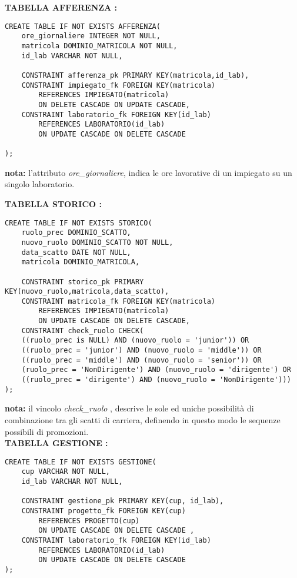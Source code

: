 \noindent\textbf{TABELLA AFFERENZA :}
\scriptsize
\begin{lstlisting}
CREATE TABLE IF NOT EXISTS AFFERENZA(
	ore_giornaliere INTEGER NOT NULL,
	matricola DOMINIO_MATRICOLA NOT NULL,
	id_lab VARCHAR NOT NULL,

	CONSTRAINT afferenza_pk PRIMARY KEY(matricola,id_lab),
	CONSTRAINT impiegato_fk FOREIGN KEY(matricola) 
        REFERENCES IMPIEGATO(matricola)
		ON DELETE CASCADE ON UPDATE CASCADE,
	CONSTRAINT laboratorio_fk FOREIGN KEY(id_lab) 
        REFERENCES LABORATORIO(id_lab)
		ON UPDATE CASCADE ON DELETE CASCADE

);
\end{lstlisting}
\normalsize
\textbf{nota:} l'attributo \textit{ore\_giornaliere}, indica le ore lavorative di un impiegato su un singolo laboratorio.

\newpage

\noindent\textbf{TABELLA STORICO :}
\scriptsize
\begin{lstlisting}
CREATE TABLE IF NOT EXISTS STORICO(
	ruolo_prec DOMINIO_SCATTO,
	nuovo_ruolo DOMINIO_SCATTO NOT NULL, 
	data_scatto DATE NOT NULL,
	matricola DOMINIO_MATRICOLA,

	CONSTRAINT storico_pk PRIMARY KEY(nuovo_ruolo,matricola,data_scatto),
	CONSTRAINT matricola_fk FOREIGN KEY(matricola) 
        REFERENCES IMPIEGATO(matricola)
		ON UPDATE CASCADE ON DELETE CASCADE,
	CONSTRAINT check_ruolo CHECK(
    ((ruolo_prec is NULL) AND (nuovo_ruolo = 'junior')) OR 
    ((ruolo_prec = 'junior') AND (nuovo_ruolo = 'middle')) OR
    ((ruolo_prec = 'middle') AND (nuovo_ruolo = 'senior')) OR
    (ruolo_prec = 'NonDirigente') AND (nuovo_ruolo = 'dirigente') OR
    ((ruolo_prec = 'dirigente') AND (nuovo_ruolo = 'NonDirigente'))) );
\end{lstlisting}
\normalsize

\textbf{nota:} il vincolo \textit{check\_ruolo} , descrive le sole ed uniche possibilità di combinazione tra gli scatti di carriera, definendo in questo modo le sequenze possibili di promozioni.\\

\noindent\textbf{TABELLA GESTIONE :}
\scriptsize
\begin{lstlisting}
CREATE TABLE IF NOT EXISTS GESTIONE(
	cup VARCHAR NOT NULL,
	id_lab VARCHAR NOT NULL,

	CONSTRAINT gestione_pk PRIMARY KEY(cup, id_lab),
	CONSTRAINT progetto_fk FOREIGN KEY(cup) 
        REFERENCES PROGETTO(cup)
		ON UPDATE CASCADE ON DELETE CASCADE ,
	CONSTRAINT laboratorio_fk FOREIGN KEY(id_lab) 
        REFERENCES LABORATORIO(id_lab)
		ON UPDATE CASCADE ON DELETE CASCADE
);
\end{lstlisting}


